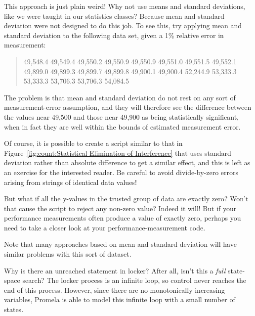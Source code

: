 \QuickQ{}
	This approach is just plain weird!
	Why not use means and standard deviations, like we were taught
	in our statistics classes?
\QuickA{}
	Because mean and standard deviation were not designed to do this job.
	To see this, try applying mean and standard deviation to the
	following data set, given a 1\% relative error in measurement:

	\begin{quote}
		49,548.4 49,549.4 49,550.2 49,550.9 49,550.9 49,551.0
		49,551.5 49,552.1 49,899.0 49,899.3 49,899.7 49,899.8
		49,900.1 49,900.4 52,244.9 53,333.3 53,333.3 53,706.3
		53,706.3 54,084.5
	\end{quote}

	The problem is that mean and standard deviation do not rest on
	any sort of measurement-error assumption, and they will therefore
	see the difference between the values near 49,500 and those near
	49,900 as being statistically significant, when in fact they are
	well within the bounds of estimated measurement error.

	Of course, it is possible to create a script similar to
	that in
	Figure~\ref{fig:count:Statistical Elimination of Interference}
	that uses standard deviation rather than absolute difference
	to get a similar effect,
	and this is left as an exercise for the interested reader.
	Be careful to avoid divide-by-zero errors arising from strings
	of identical data values!

\QuickQ{}
	But what if all the y-values in the trusted group of data
	are exactly zero?
	Won't that cause the script to reject any non-zero value?
\QuickA{}
	Indeed it will!
	But if your performance measurements often produce a value of
	exactly zero, perhaps you need to take a closer look at your
	performance-measurement code.

	Note that many approaches based on mean and standard deviation
	will have similar problems with this sort of dataset.

\QuickQ{}
	Why is there an unreached statement in
	locker?  After all, isn't this a \emph{full} state-space
	search?
\QuickA{}
	The locker process is an infinite loop, so control
	never reaches the end of this process.
	However, since there are no monotonically increasing variables,
	Promela is able to model this infinite loop with a small
	number of states.


